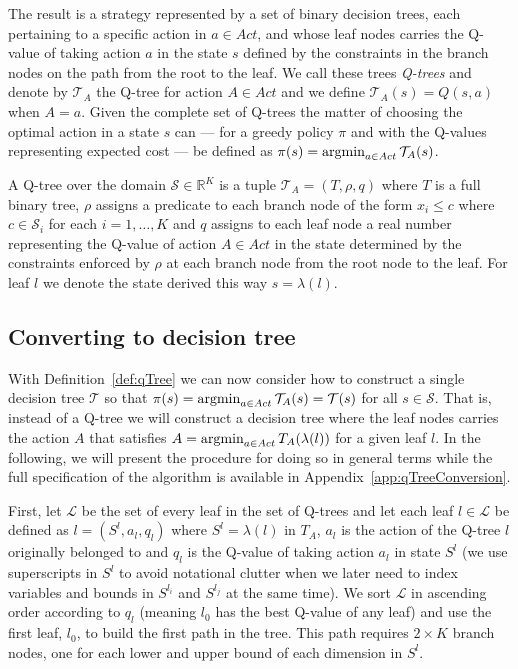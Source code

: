 The result is a strategy represented by a set of binary decision trees, each
pertaining to a specific action in $a \in Act$, and whose leaf nodes carries the
Q-value of taking action $a$ in the state $s$ defined by the constraints in the
branch nodes on the path from the root to the leaf. We call these trees
\textit{Q-trees} and denote by $\mathcal{T}_A$ the Q-tree for action $A \in Act$
and we define $\mathcal{T}_A(s) = Q(s,a)$ when $A=a$. Given the complete set of Q-trees
the matter of choosing the optimal action in a state $s$ can --- for a greedy
policy $\pi$ and with the Q-values representing expected cost --- be defined as
$\pi(s) = \operatorname*{argmin}_{a\in Act} \mathcal{T}_A(s)$.

\begin{definition}[Q-tree]%
\label{def:qTree}
    A Q-tree over the domain $\mathcal{S} \in \mathbb{R}^K$ is a tuple
    $\mathcal{T}_A = (T, \rho, q)$ where $T$ is a full binary tree, $\rho$
    assigns a predicate to each branch node of the form $x_i \le c$ where $c \in
    \mathcal{S}_i$ for each $i = 1, \ldots, K$ and $q$ assigns to each leaf node
    a real number representing the Q-value of action $A \in Act$ in the state
    determined by the constraints enforced by $\rho$ at each branch node from
    the root node to the leaf. For leaf $l$ we denote the state derived this way
    $s = \lambda(l)$.
\end{definition}


\subsection{Converting to decision tree}%
\label{subsec:convertQTtoDT}

With Definition~\ref{def:qTree} we can now consider how to construct a single
decision tree $\mathcal{T}$ so that $\pi(s) = \operatorname*{argmin}_{a \in Act}
\mathcal{T}_A(s) = \mathcal{T}(s)$ for all $s \in \mathcal{S}$. That is, instead
of a Q-tree we will construct a decision tree where the leaf nodes carries the
action $A$ that satisfies $A = \operatorname*{argmin}_{a \in Act} T_A(\lambda(l))$ for
a given leaf $l$. In the following, we will present the procedure for doing so
in general terms while the full specification of the algorithm is available in
Appendix~\ref{app:qTreeConversion}.

First, let $\mathcal{L}$ be the set of every leaf in the set of Q-trees and let
each leaf $l \in \mathcal{L}$ be defined as $l = (S^{l}, a_l, q_l)$ where $S^{l} =
\lambda(l)$ in $T_A$, $a_l$ is the action of the Q-tree $l$ originally belonged to
and $q_l$ is the Q-value of taking action $a_l$ in state $S^{l }$ (we use
superscripts in $S^l$ to avoid notational clutter when we later need to index
variables and bounds in $S^{l_i}$ and $S^{l_j}$ at the same time). We sort
$\mathcal{L}$ in ascending order according to $q_l$ (meaning $l_0$ has the best
Q-value of any leaf) and use the first leaf, $l_0$, to build the first path in
the tree. This path requires $2 \times K$ branch nodes, one for each lower and
upper bound of each dimension in  $S^{l}$.

